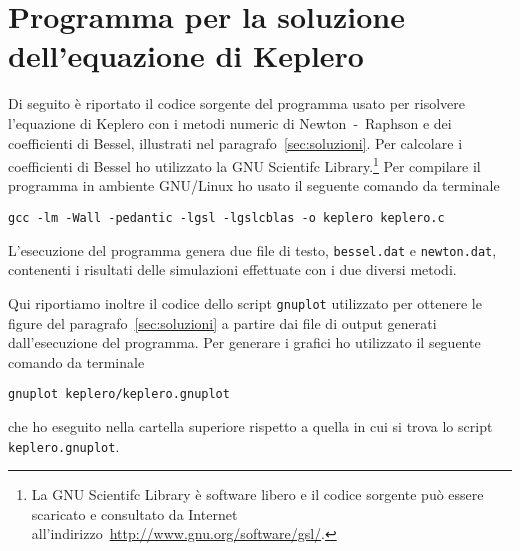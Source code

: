 \chapter{Programma per la soluzione dell'equazione di Keplero}
\label{cha:soluzione-keplero}

Di seguito è riportato il codice sorgente del programma usato per risolvere
l'equazione di Keplero con i metodi numeric di Newton~-~Raphson e dei
coefficienti di Bessel, illustrati nel paragrafo~\ref{sec:soluzioni}. Per
calcolare i coefficienti di Bessel ho utilizzato la GNU Scientifc
Library.\footnote{La GNU Scientifc Library è software libero e il codice
  sorgente può essere scaricato e consultato da Internet
  all'indirizzo~\url{http://www.gnu.org/software/gsl/}.} Per compilare il
programma in ambiente GNU/Linux ho usato il seguente comando da terminale
\begin{verbatim}
gcc -lm -Wall -pedantic -lgsl -lgslcblas -o keplero keplero.c
\end{verbatim}
L'esecuzione del programma genera due file di testo, \verb|bessel.dat| e
\verb|newton.dat|, contenenti i risultati delle simulazioni effettuate con i due
diversi metodi.
% 

Qui riportiamo inoltre il codice dello script \verb|gnuplot| utilizzato per
ottenere le figure del paragrafo~\ref{sec:soluzioni} a partire dai file di
output generati dall'esecuzione del programma. Per generare i grafici ho
utilizzato il seguente comando da terminale
\begin{verbatim}
gnuplot keplero/keplero.gnuplot
\end{verbatim}
che ho eseguito nella cartella superiore rispetto a quella in cui si trova lo
script \verb|keplero.gnuplot|.



